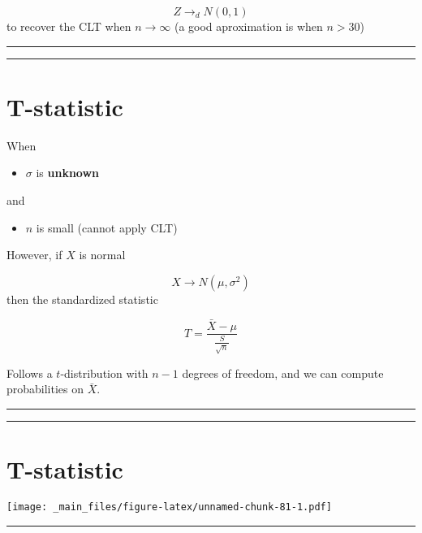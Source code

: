 \documentclass[
]{book}
\providecommand{\tightlist}{%
  \setlength{\itemsep}{0pt}\setlength{\parskip}{0pt}}
\begin{document}
\[Z \rightarrow_d N(0,1)\] to recover the CLT when \(n\rightarrow \infty\) (a good aproximation is when \(n>30\))

\begin{center}\rule{0.5\linewidth}{0.5pt}\end{center}

\begin{center}\rule{0.5\linewidth}{0.5pt}\end{center}

\hypertarget{t-statistic}{%
\section{T-statistic}\label{t-statistic}}

When

\begin{itemize}
\tightlist
\item
  \(\sigma\) is \textbf{unknown}
\end{itemize}

and

\begin{itemize}
\tightlist
\item
  \(n\) is small (cannot apply CLT)
\end{itemize}

However, if \(X\) is normal

\[X \rightarrow N(\mu, \sigma^2)\] then the standardized statistic

\[T=\frac{\bar{X}-\mu}{\frac{S}{\sqrt{n}}} \]

Follows a \(t\)-distribution with \(n-1\) degrees of freedom, and we can compute probabilities on \(\bar{X}\).

\begin{center}\rule{0.5\linewidth}{0.5pt}\end{center}

\begin{center}\rule{0.5\linewidth}{0.5pt}\end{center}

\hypertarget{t-statistic-1}{%
\section{T-statistic}\label{t-statistic-1}}

\texttt{[image: \_main\_files/figure-latex/unnamed-chunk-81-1.pdf]}

\begin{center}\rule{0.5\linewidth}{0.5pt}\end{center}
\end{document}
